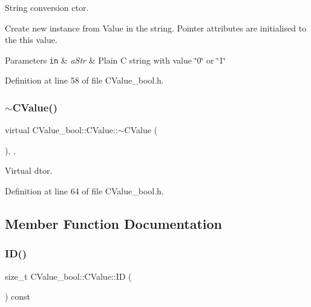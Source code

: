String conversion c\textquotesingle{}tor. 

Create new instance from Value in the string. Pointer attributes are initialised to the {\ttfamily this} value. 
\begin{DoxyParams}[1]{Parameters}
\mbox{\tt in}  & {\em a\+Str} & Plain C string with value \char`\"{}0\char`\"{} or \char`\"{}1\char`\"{} \\
\hline
\end{DoxyParams}


Definition at line 58 of file C\+Value\+\_\+bool.\+h.

\mbox{\label{class_c_value__bool_1_1_c_value_acdc5cb2d30dedc5f34d586e2560eea79}} 
\subsubsection{\texorpdfstring{$\sim$\+C\+Value()}{~CValue()}}
{\footnotesize\ttfamily virtual C\+Value\+\_\+bool\+::\+C\+Value\+::$\sim$\+C\+Value (\begin{DoxyParamCaption}{ }\end{DoxyParamCaption})\hspace{0.3cm}{\ttfamily [inline]}, {\ttfamily [virtual]}, {\ttfamily [noexcept]}}



Virtual d\textquotesingle{}tor. 



Definition at line 64 of file C\+Value\+\_\+bool.\+h.



\subsection{Member Function Documentation}
\mbox{\label{class_c_value__bool_1_1_c_value_a028335ed71781b92b96dfb51e1118eda}} 
\subsubsection{\texorpdfstring{I\+D()}{ID()}}
{\footnotesize\ttfamily size\+\_\+t C\+Value\+\_\+bool\+::\+C\+Value\+::\+ID (\begin{DoxyParamCaption}{ }\end{DoxyParamCaption}) const\hspace{0.3cm}{\ttfamily [inline]}}



